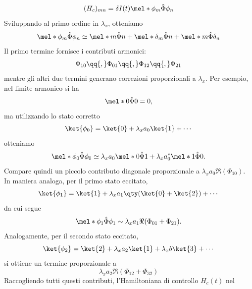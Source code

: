 \begin{equation*}
    (H_c)_{mn}
    =
    \delta I(t)
    \mel*{\phi_m}{\hat{\Phi}}{\phi_n}
\end{equation*}
Sviluppando al primo ordine in $\lambda_x$, otteniamo
\begin{equation*}
    \mel*{\phi_m}{\hat{\Phi}}{\phi_n}
    \simeq
    \mel*{m}{\hat{\Phi}}{n}
    +
    \mel*{\delta_m}{\hat{\Phi}}{n}
    +
    \mel*{m}{\hat{\Phi}}{\delta_n}
\end{equation*}
Il primo termine fornisce i contributi armonici:
\begin{equation*}
    \Phi_{10}
    \qq{,}
    \Phi_{01}
    \qq{,}
    \Phi_{12}
    \qq{,}
    \Phi_{21}
\end{equation*}
mentre gli altri due termini generano correzioni proporzionali a
$\lambda_x$.
Per esempio, nel limite armonico si ha
\begin{equation*}
    \mel*{0}{\hat{\Phi}}{0}=0,
\end{equation*}
ma utilizzando lo stato corretto
\begin{equation*}
    \ket{\phi_0}
    =
    \ket{0}
    +
    \lambda_x a_0 \ket{1}
    + \cdots
\end{equation*}
otteniamo
\begin{equation*}
    \mel*{\phi_0}{\hat{\Phi}}{\phi_0}
    \simeq
    \lambda_x a_0
    \mel*{0}{\hat{\Phi}}{1}
    +
    \lambda_x a_0^{*}
    \mel*{1}{\hat{\Phi}}{0}.
\end{equation*}
Compare quindi un piccolo contributo diagonale proporzionale a $\lambda_x a_0 \Re(\Phi_{10})$. In maniera analoga, per il primo stato eccitato,
\begin{equation*}
    \ket{\phi_1}
    =
    \ket{1}
    +
    \lambda_x a_1
    \qty(
    \ket{0}+\ket{2}
    )
    + \cdots
\end{equation*}
da cui segue
\begin{equation*}
    \mel*{\phi_1}{\hat{\Phi}}{\phi_1}
    \sim
    \lambda_x a_1
    \Re(\Phi_{01}+\Phi_{21}).
\end{equation*}
Analogamente, per il secondo stato eccitato,
\begin{equation*}
    \ket{\phi_2}
    =
    \ket{2}
    +
    \lambda_x a_2 \ket{1}
    +
    \lambda_x b \ket{3}
    + \cdots
\end{equation*}
si ottiene un termine proporzionale a
\begin{equation*}
    \lambda_x a_2
    \Re(\Phi_{12}+\Phi_{32})
\end{equation*}
Raccogliendo tutti questi contributi, l'Hamiltoniana di controllo $H_c(t)$ nel
